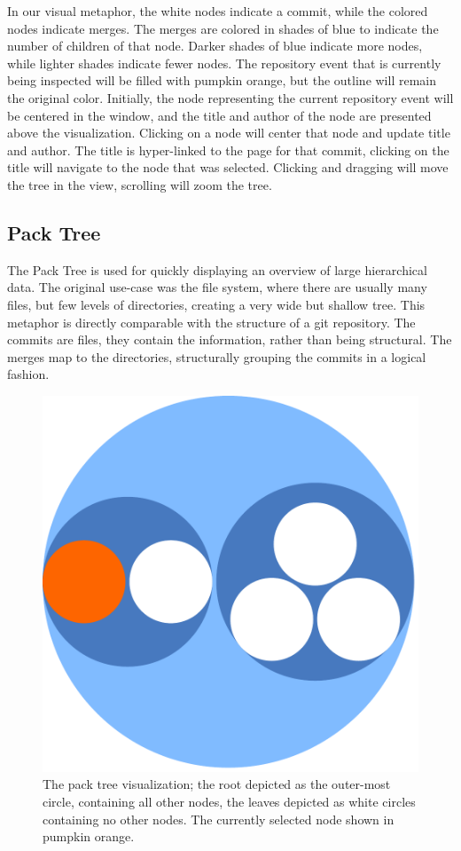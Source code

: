 In our visual metaphor, the white nodes indicate a commit, while the
colored nodes indicate merges. The merges are colored in shades of blue
to indicate the number of children of that node. Darker shades of blue
indicate more nodes, while lighter shades indicate fewer nodes. The
repository event that is currently being inspected will be filled with
pumpkin orange, but the outline will remain the original color.
Initially, the node representing the current repository event will be
centered in the window, and the title and author of the node are
presented above the visualization. Clicking on a node will center that
node and update title and author. The title is hyper-linked to the page
for that commit, clicking on the title will navigate to the node that
was selected. Clicking and dragging will move the tree in the view,
scrolling will zoom the tree.

\subsection{Pack Tree}
\label{sub:pack_tree}

The Pack Tree\cite{Wang2006} is used for quickly displaying an overview
of large hierarchical data. The original use-case was the file system,
where there are usually many files, but few levels of directories,
creating a very wide but shallow tree. This metaphor is directly
comparable with the structure of a git repository. The commits are
files, they contain the information, rather than being structural. The
merges map to the directories, structurally grouping the commits in a
logical fashion.

\begin{figure}[htpb]
  \centering
  \includegraphics[width=0.4\linewidth]{Figures/Linvis/linvis_bubble.pdf}
  \caption{The pack tree visualization; the root depicted as the
    outer-most circle, containing all other nodes, the leaves depicted
    as white circles containing no other nodes. The currently selected
    node shown in pumpkin orange.}
  \label{fig:linvis_bubble_tree}
\end{figure}

